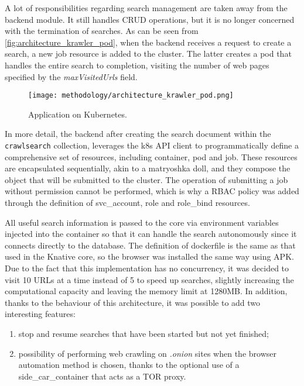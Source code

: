 \documentclass[../thesis.tex]{subfiles}
\begin{document}
A lot of responsibilities regarding search management are taken away from the backend module. It still handles \acrshort{CRUD} operations, but it is no longer concerned with the termination of searches. As can be seen from \autoref{fig:architecture_krawler_pod}, when the backend receives a request to create a search, a new \gls{job} resource is added to the cluster. The latter creates a \gls{pod} that handles the entire search to completion, visiting the number of web pages specified by the \textit{maxVisitedUrls} field.

\begin{figure}[H]
    \centering
    \texttt{[image: methodology/architecture\_krawler\_pod.png]}
    \caption[Kubernetes implementation]{Application on Kubernetes.}
    \label{fig:architecture_krawler_pod}
\end{figure}

In more detail, the backend after creating the search document within the \texttt{crawlsearch} collection, leverages the \gls{k8s} \acrshort{API} client \cite{site:k8s_client_js} to programmatically define a comprehensive set of resources, including \gls{container}, \gls{pod} and \gls{job}. These resources are encapsulated sequentially, akin to a matryoshka doll, and they compose the object that will be submitted to the cluster. The operation of submitting a \gls{job} without permission cannot be performed, which is why a \acrfull{RBAC} policy was added through the definition of \gls{svc_account}, \gls{role} and \gls{role_bind} resources.

All useful search information is passed to the core via environment variables injected into the \gls{container} so that it can handle the search autonomously since it connects directly to the database. The definition of \gls{dockerfile} is the same as that used in the Knative core, so the browser was installed the same way using \acrshort{APK}. Due to the fact that this implementation has no concurrency, it was decided to visit 10 \acrshort{URL}s at a time instead of 5 to speed up searches, slightly increasing the computational capacity and leaving the memory limit at 1280MB. In addition, thanks to the behaviour of this architecture, it was possible to add two interesting features:

\begin{enumerate}
    \item stop and resume searches that have been started but not yet finished;
    \item possibility of performing web crawling on \textit{.onion} sites when the browser automation method is chosen, thanks to the optional use of a \gls{side_car_container} that acts as a \acrshort{TOR} proxy.
\end{enumerate}
\end{document}
